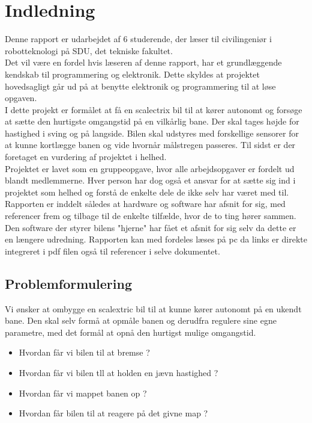 \section{Indledning}

Denne rapport er udarbejdet af 6 studerende, der læser til civilingeniør i robotteknologi på SDU, det tekniske fakultet.\\

Det vil være en fordel hvis læseren af denne rapport, har et grundlæggende kendskab til programmering og elektronik. Dette skyldes at projektet hovedsagligt går ud på at benytte elektronik og programmering til at løse opgaven.\\
I dette projekt er formålet at få en scalectrix bil til at kører autonomt og forsøge at sætte den hurtigste omgangstid på en vilkårlig bane. Der skal tages højde for hastighed i sving og på langside. Bilen skal udstyres med forskellige sensorer for at kunne kortlægge banen og vide hvornår målstregen passeres. Til sidst er der foretaget en vurdering af projektet i helhed.\\
Projektet er lavet som en gruppeopgave, hvor alle arbejdsopgaver er fordelt ud blandt medlemmerne. Hver person har dog også et ansvar for at sætte sig ind i projektet som helhed og forstå de enkelte dele de ikke selv har været med til. Rapporten er inddelt således at hardware og software har afsnit for sig, med referencer frem og tilbage til de enkelte tilfælde, hvor de to ting hører sammen. Den software der styrer bilens "hjerne" har fået et afsnit for sig selv da dette er en længere udredning. Rapporten kan med fordeles læses på pc da links er direkte integreret i pdf filen også til referencer i selve dokumentet.


\subsection{Problemformulering}

Vi ønsker at ombygge en scalextric bil til at kunne kører autonomt på en ukendt bane. Den skal selv formå at opmåle banen og derudfra regulere sine egne parametre, med det formål at opnå den hurtigst mulige omgangstid.
\begin{itemize}
	\item Hvordan får vi bilen til at bremse ?
	\item Hvordan får vi bilen tll at holden en jævn hastighed ?
	\item Hvordan får vi mappet banen op ?
	\item Hvordan får bilen til at reagere på det givne map ?
\end{itemize}

